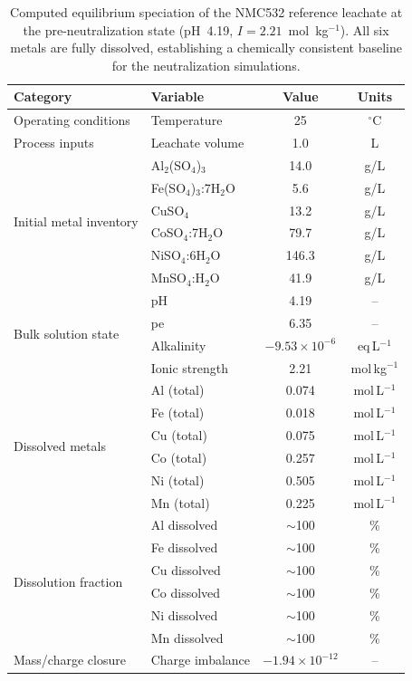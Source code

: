 \documentclass[final,2p,times]{elsarticle}
\begin{document}
\begin{table}[!ht]
\centering
\caption{Computed equilibrium speciation of the NMC532 reference leachate at the pre-neutralization state (pH~4.19, $I = 2.21$~mol~kg$^{-1}$). All six metals are fully dissolved, establishing a chemically consistent baseline for the neutralization simulations.}
\label{tab:baseline_leachate}
\small
\setlength{\tabcolsep}{4pt}
\renewcommand{\arraystretch}{1.0}
\begin{tabularx}{0.60\linewidth}{p{2.8cm} p{2.5cm} cc}
\toprule
\textbf{Category} & \textbf{Variable} & \textbf{Value} & \textbf{Units} \\
\midrule
Operating conditions & Temperature & 25 & $^\circ$C \\
Process inputs & Leachate volume & 1.0 & L \\
\midrule
\multirow{6}{*}{Initial metal inventory}
 & Al$_2$(SO$_4$)$_3$      & 14.0  & g/L \\
 & Fe(SO$_4$)$_3$:7H$_2$O  & 5.6   & g/L \\
 & CuSO$_4$                 & 13.2  & g/L \\
 & CoSO$_4$:7H$_2$O         & 79.7  & g/L \\
 & NiSO$_4$:6H$_2$O         & 146.3 & g/L \\
 & MnSO$_4$:H$_2$O          & 41.9  & g/L \\
\midrule
\multirow{4}{*}{Bulk solution state}
 & pH               & 4.19                  & --              \\
 & pe               & 6.35                  & --              \\
 & Alkalinity       & $-9.53\times10^{-6}$  & eq\,L$^{-1}$   \\
 & Ionic strength   & 2.21                  & mol\,kg$^{-1}$ \\
\midrule
\multirow{6}{*}{Dissolved metals}
 & Al (total) & 0.074 & mol\,L$^{-1}$ \\
 & Fe (total) & 0.018 & mol\,L$^{-1}$ \\
 & Cu (total) & 0.075 & mol\,L$^{-1}$ \\
 & Co (total) & 0.257 & mol\,L$^{-1}$ \\
 & Ni (total) & 0.505 & mol\,L$^{-1}$ \\
 & Mn (total) & 0.225 & mol\,L$^{-1}$ \\
\midrule
\multirow{6}{*}{Dissolution fraction}
 & Al dissolved & $\sim$100 & \% \\
 & Fe dissolved & $\sim$100 & \% \\
 & Cu dissolved & $\sim$100 & \% \\
 & Co dissolved & $\sim$100 & \% \\
 & Ni dissolved & $\sim$100 & \% \\
 & Mn dissolved & $\sim$100 & \% \\
\midrule
Mass/charge closure & Charge imbalance & $-1.94\times10^{-12}$ & -- \\
\bottomrule
\end{tabularx}
\end{table}
\end{document}
